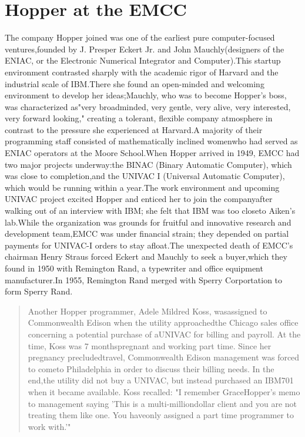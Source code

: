 \section{Hopper at the EMCC}
The company Hopper joined was one of the earliest pure computer-focused
ventures,founded by J. Presper Eckert Jr. and John Mauchly(designers of the
ENIAC, or the Electronic Numerical Integrator and Computer).This startup
environment contrasted sharply with the academic rigor of Harvard and the
industrial scale of IBM.There she found an open-minded and welcoming
environment to develop her ideas;Mauchly, who was to become Hopper's boss, was
characterized as"very broadminded, very gentle, very alive, very interested,
very forward looking,"
\cite{grace_hopper_and_the_invention_of_the_information_age_2009} creating a
tolerant, flexible company atmosphere in contrast to the pressure she
experienced at Harvard.A majority of their programming staff consisted of
mathematically inclined womenwho had served as ENIAC operators at the Moore
School.When Hopper arrived in 1949, EMCC had two major projects underway:the
BINAC (Binary Automatic Computer), which was close to completion,and the UNIVAC
I (Universal Automatic Computer), which would be running within a year.The work
environment and upcoming UNIVAC project excited Hopper and enticed her to join
the companyafter walking out of an interview with IBM; she felt that IBM was
too closeto Aiken's lab.While the organization was grounds for fruitful and
innovative research and development team,EMCC was under financial strain; they
depended on partial payments for UNIVAC-I orders to stay afloat.The unexpected
death of EMCC's chairman Henry Straus forced Eckert and Mauchly to seek a
buyer,which they found in 1950 with Remington Rand, a typewriter and office
equipment manufacturer.In 1955, Remington Rand merged with Sperry Corportation
to form Sperry Rand.
\begin{quotation}
    Another Hopper programmer, Adele Mildred Koss, wasassigned to Commonwealth 
Edison when the utility approachedthe Chicago sales office concerning a 
potential purchase of aUNIVAC for billing and payroll. At the time, Koss was 7 
monthspregnant and working part time. Since her pregnancy precludedtravel, 
Commonwealth Edison management was forced to cometo Philadelphia in order to 
discuss their billing needs. In the end,the utility did not buy a UNIVAC, but 
instead purchased an IBM701 when it became available. Koss recalled: "I 
remember GraceHopper's memo to management saying 'This is a multi-milliondollar 
client and you are not treating them like one. You haveonly assigned a part 
time programmer to work with.'"
    \cite[Adele Mildred Koss, interviewed by Kathy Kleiman]{grace_hopper_and_the_invention_of_the_information_age_2009}
\end{quotation}
